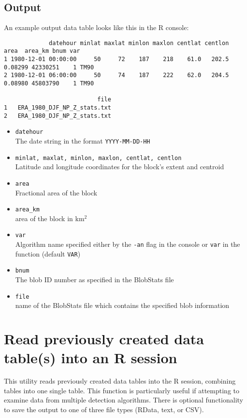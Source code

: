 \documentclass{article}
\begin{document}
\subsection{Output}\label{tableoutput}

An example output data table looks like this in the R console:
\begin{verbatim}
             datehour minlat maxlat minlon maxlon centlat centlon    area  area_km bnum var
1 1980-12-01 00:00:00     50     72    187    218    61.0   202.5 0.08299 42330251    1 TM90
2 1980-12-01 06:00:00     50     74    187    222    62.0   204.5 0.08980 45803790    1 TM90

                           file
1   ERA_1980_DJF_NP_Z_stats.txt
2   ERA_1980_DJF_NP_Z_stats.txt
\end{verbatim}

\begin{itemize}
\item[]\texttt{datehour}\\The date string in the format \texttt{YYYY-MM-DD-HH}
\item[] \texttt{minlat, maxlat, minlon, maxlon, centlat, centlon}\\ Latitude and longitude coordinates for the block's extent and centroid
\item[] \texttt{area}\\ Fractional area of the block
\item[] \texttt{area\_km}\\area of the block in km$^2$
\item[] \texttt{var}\\ Algorithm name specified either by the \texttt{-an} flag in the console or \texttt{var} in the function (default \texttt{VAR})
\item[] \texttt{bnum} \\The blob ID number as specified in the BlobStats file
\item[] \texttt{file} \\name of the BlobStats file which contains the specified blob information
\end{itemize}

\section{Read previously created data table(s) into an R session}\label{combinetable}
This utility reads previously created data tables into the R session, combining tables into one single table. This function is particularly useful if attempting to examine data from multiple detection algorithms. There is optional functionality to save the output to one of three file types (RData, text, or CSV).
\end{document}
